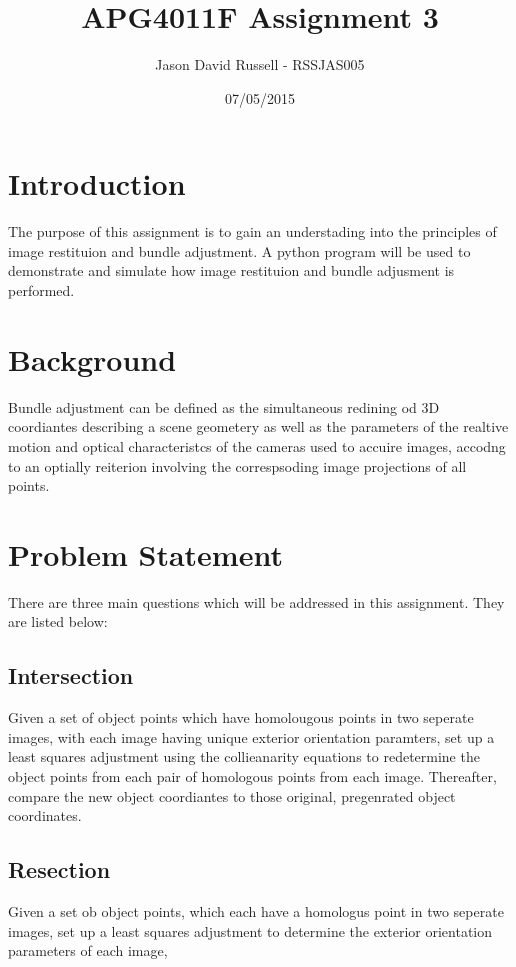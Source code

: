 \documentclass{article}
\title{APG4011F Assignment 3}
\date{07/05/2015}
\author{Jason David Russell - RSSJAS005}
\begin{document}
\maketitle
{}

\newpage
\tableofcontents


\newpage
\section{Introduction}
The purpose of this assignment is to gain an understading into the principles of image restituion and bundle adjustment.
A python program will be used to demonstrate and simulate how image restituion and bundle adjusment is performed.

\section{Background}
Bundle adjustment can be defined as the simultaneous redining od 3D coordiantes describing a scene geometery as well 
as the parameters of the realtive motion and optical characteristcs of the cameras used to accuire images, 
accodng to an optially reiterion involving the correspsoding image projections of all points.


\section{Problem Statement}
There are three main questions which will be addressed in this assignment. They are listed below:

\subsection{Intersection}
Given a set of object points which have homolougous points in two seperate images, with each image having unique exterior 
orientation paramters, set up a least squares adjustment using the collieanarity equations to redetermine the object points 
from each pair of homologous points from each image. Thereafter, compare the new object coordiantes to those original, 
pregenrated object coordinates.

\subsection{Resection}
Given a set ob object points, which each have a homologus point in two seperate images, set up a least squares adjustment 
to determine the exterior orientation parameters of each image,
\end{document}
